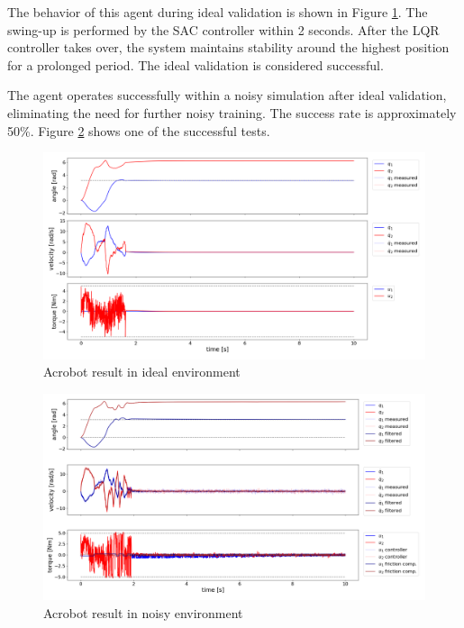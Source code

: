The behavior of this agent during ideal validation is shown in Figure \ref{fig:acrobot_ideal}. The swing-up is performed by the SAC controller within 2 seconds. After the LQR controller takes over, the system maintains stability around the highest position for a prolonged period. The ideal validation is considered successful.

The agent operates successfully within a noisy simulation after ideal validation, eliminating the need for further noisy training. The success rate is approximately 50\%. Figure \ref{fig:acrobot_noisy} shows one of the successful tests.

\begin{figure}[H]
    \centering
    \includegraphics[width=1.0\linewidth]{figures/hardware_result/acrobot_ideal_simulation_designC.1.png}
    \caption{Acrobot result in ideal environment}
    \label{fig:acrobot_ideal}
\end{figure}

\begin{figure}[H]
    \centering
    \includegraphics[width=1.0\linewidth]{figures/hardware_result/acrobot_noisy_simulation_designC.1.png}
    \caption{Acrobot result in noisy environment}
    \label{fig:acrobot_noisy}
\end{figure}

